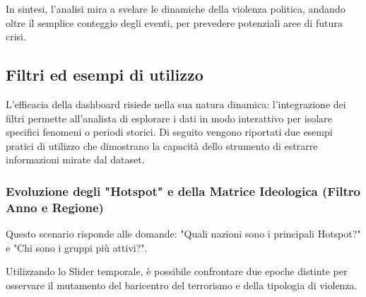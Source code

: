 In sintesi, l'analisi mira a svelare le dinamiche della violenza politica, andando oltre il semplice conteggio degli eventi, per prevedere potenziali aree di futura crisi.

\subsection{Filtri ed esempi di utilizzo}

L’efficacia della dashboard risiede nella sua natura dinamica: l’integrazione dei filtri permette all'analista di esplorare i dati in modo interattivo per isolare specifici fenomeni o periodi storici. Di seguito vengono riportati due esempi pratici di utilizzo che dimostrano la capacità dello strumento di estrarre informazioni mirate dal dataset.

\subsubsection{Evoluzione degli "Hotspot" e della Matrice Ideologica (Filtro Anno e Regione)}

Questo scenario risponde alle domande: "Quali nazioni sono i principali Hotspot?" e "Chi sono i gruppi più attivi?".

Utilizzando lo Slider temporale, è possibile confrontare due epoche distinte per osservare il mutamento del baricentro del terrorismo e della tipologia di violenza.

